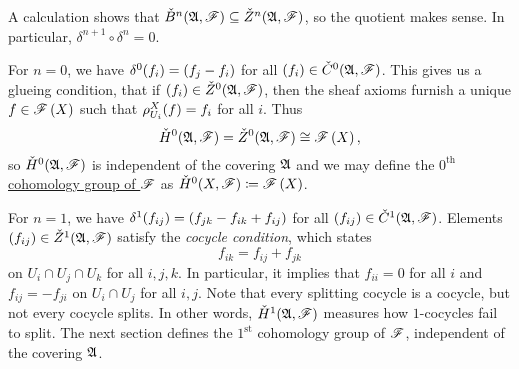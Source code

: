 \documentclass[../Moduli_Spaces_of_Riemann_Surfaces.tex]{subfiles}
\begin{document}
    \vspace{-0.05in}
    \begin{remark}
        A calculation shows that $\check{B}^n\!\left(\mathfrak{A},\mathscr{F}\right)\subseteq\check{Z}^n\!\left(\mathfrak{A},\mathscr{F}\right)$, so the quotient makes sense. In particular, $\delta^{n+1}\circ\delta^n=0$.\exqed
    \end{remark}
    \begin{remark}
        For $n=0$, we have $\delta^0\!\left(f_i\right)=\left(f_j-f_i\right)$ for all $\left(f_i\right)\in\check{C}^0\!\left(\mathfrak{A},\mathscr{F}\right)$. This gives us a glueing condition, that if $\left(f_i\right)\in\check{Z}^0\!\left(\mathfrak{A},\mathscr{F}\right)$, then the sheaf axioms furnish a unique $f\in\mathscr{F}\left(X\right)$ such that $\rho^X_{U_i}\!\left(f\right)=f_i$ for all $i$. Thus
        \begin{equation*}
            \check{H}^0\!\left(\mathfrak{A},\mathscr{F}\right)=\check{Z}^0\!\left(\mathfrak{A},\mathscr{F}\right)\cong\mathscr{F}\left(X\right),
        \end{equation*}
        so $\check{H}^0\!\left(\mathfrak{A},\mathscr{F}\right)$ is independent of the covering $\mathfrak{A}$ and we may define the \ul{$0^\textrm{th}$ cohomology group of $\mathscr{F}$} as $\check{H}^0\!\left(X,\mathscr{F}\right)\coloneqq\mathscr{F}\left(X\right)$.\exqed
    \end{remark}
    \begin{remark}
        For $n=1$, we have $\delta^1\!\left(f_{ij}\right)=\left(f_{jk}-f_{ik}+f_{ij}\right)$ for all $\left(f_{ij}\right)\in\check{C}^1\!\left(\mathfrak{A},\mathscr{F}\right)$. Elements $\left(f_{ij}\right)\in\check{Z}^1\!\left(\mathfrak{A},\mathscr{F}\right)$ satisfy the \textit{cocycle condition}, which states
        \begin{equation*}
            f_{ik}=f_{ij}+f_{jk}
        \end{equation*}
        on $U_i\cap U_j\cap U_k$ for all $i,j,k$. In particular, it implies that $f_{ii}=0$ for all $i$ and $f_{ij}=-f_{ji}$ on $U_i\cap U_j$ for all $i,j$. Note that every splitting cocycle is a cocycle, but not every cocycle splits. In other words, $\check{H}^1\!\left(\mathfrak{A},\mathscr{F}\right)$ measures how $1$-cocycles fail to split. The next section defines the $1^\textrm{st}$ cohomology group of $\mathscr{F}$, independent of the covering $\mathfrak{A}$.\exqed
    \end{remark}
\end{document}
